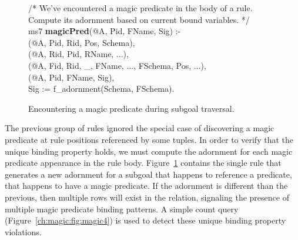 \begin{figure}[!t]
\ssp
\centering
\begin{boxedminipage}{\linewidth}
/* We've encountered a magic predicate in the body of a rule. \\
   Compute its adornment based on current bound variables. */ \\
ms7 {\bf magicPred}(@A, Pid, FName, Sig) :- \\
(@A, Pid, Rid, Pos, Schema), \\
(@A, Rid, Pid, RName, ...), \\
(@A, Fid, Rid, \_, FName, ..., FSchema, Pos, ...), \\
(@A, Pid, FName, Sig), \\
\datalogspace Sig := f\_adornment(Schema, FSchema).

\end{boxedminipage}
\caption{\label{ch:magic:fig:magic3}Encountering a magic predicate during subgoal traversal.}
\end{figure}

The previous group of rules ignored the special case of discovering a magic
predicate at rule positions referenced by some  tuples.  In order
to verify that the unique binding property holds, we must compute the adornment
for each magic predicate appearance in the rule body.
Figure~\ref{ch:magic:fig:magic3} contains the single rule that generates a new
adornment for a subgoal that happens to reference a predicate, that happens to
have a magic predicate.  If the adornment is different than the previous, then
multiple rows will exist in the  relation, signaling the presence
of multiple magic predicate binding patterns.  A simple count query
(Figure~\ref{ch:magic:fig:magic4}) is used to detect these unique binding
property violations.  

